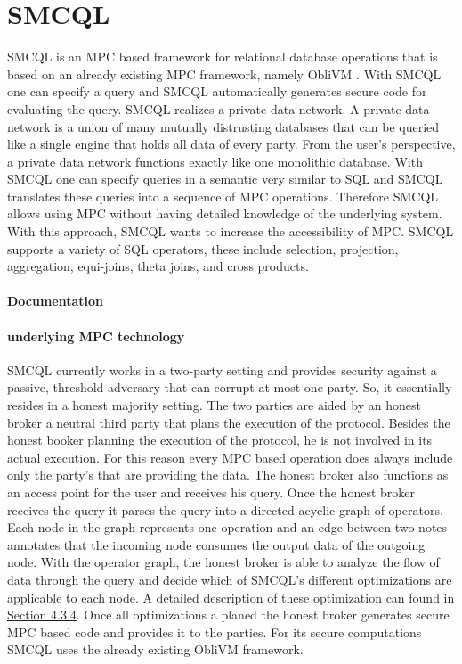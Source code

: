 \section{SMCQL}
SMCQL \cite{bater} is an MPC based framework for relational database operations that is based on an already existing MPC framework, namely ObliVM \cite{liu2015oblivm}. With SMCQL one can specify a query and SMCQL automatically generates secure code for evaluating the query. 
SMCQL realizes a private data network. A private data network is a union of many mutually distrusting databases that can be queried like a single engine that holds all data of every party. From the user's perspective, a private data network functions exactly like one monolithic database. With SMCQL one can specify queries in a semantic very similar to SQL and SMCQL translates these queries into a sequence of MPC operations. Therefore SMCQL allows using MPC without having detailed knowledge of the underlying system. With this approach, SMCQL wants to increase the accessibility of MPC. SMCQL supports a variety of SQL operators, these include selection, projection, aggregation, equi-joins, theta joins, and cross products. 


\paragraph{Documentation}




\paragraph{underlying MPC technology}
SMCQL currently works in a two-party setting and provides security against a passive, threshold adversary that can corrupt at most one party.  So, it essentially resides in a honest majority setting. The two parties are aided by an honest broker a neutral third party that plans the execution of the protocol. Besides the honest booker planning the execution of the protocol, he is not involved in its actual execution. For this reason every MPC based operation does always include only the party's that are providing the data.
The honest broker also functions as an access point for the user and receives his query. 
Once the honest broker receives the query it parses the query into a directed acyclic graph of operators. Each node in the graph represents one operation and an edge between two notes annotates that the incoming node consumes the output data of the outgoing node. With the operator graph, the honest broker is able to analyze the flow of data through the query and decide which of SMCQL's different optimizations are applicable to each node. 
A detailed description of these optimization can found in \hyperref[sec:Optimizations_smcql]{Section 4.3.4}. Once all optimizations a planed the honest broker generates secure MPC based code and provides it to the parties. For its secure computations SMCQL uses the already existing ObliVM framework.

